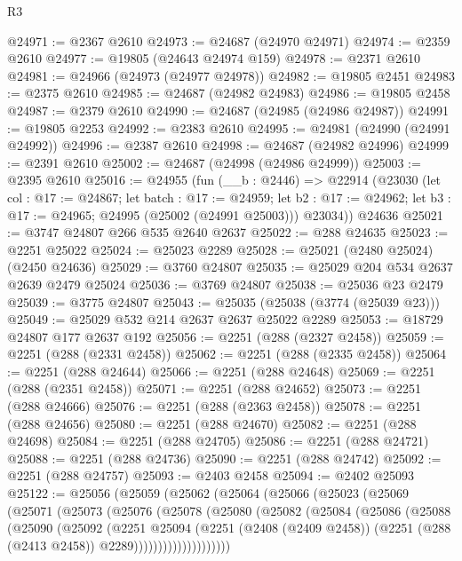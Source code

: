 \begin{lexlean}{R3}
\begin{coremodule}
@24971 := @2367 @2610
@24973 := @24687 (@24970 @24971)
@24974 := @2359 @2610
@24977 := @19805 (@24643 @24974 @159)
@24978 := @2371 @2610
@24981 := @24966 (@24973 (@24977 @24978))
@24982 := @19805 @2451
@24983 := @2375 @2610
@24985 := @24687 (@24982 @24983)
@24986 := @19805 @2458
@24987 := @2379 @2610
@24990 := @24687 (@24985 (@24986 @24987))
@24991 := @19805 @2253
@24992 := @2383 @2610
@24995 := @24981 (@24990 (@24991 @24992))
@24996 := @2387 @2610
@24998 := @24687 (@24982 @24996)
@24999 := @2391 @2610
@25002 := @24687 (@24998 (@24986 @24999))
@25003 := @2395 @2610
@25016 := @24955
    (fun (__b : @2446) =>
    @22914
      (@23030
        (let col : @17 := @24867;
        let batch : @17 := @24959;
        let b2 : @17 := @24962; let b3 : @17 := @24965; @24995 (@25002 (@24991 @25003)))
        @23034))
    @24636
@25021 := @3747 @24807 @266 @535 @2640 @2637
@25022 := @288 @24635
@25023 := @2251 @25022
@25024 := @25023 @2289
@25028 := @25021 (@2480 @25024) (@2450 @24636)
@25029 := @3760 @24807
@25035 := @25029 @204 @534 @2637 @2639 @2479 @25024
@25036 := @3769 @24807
@25038 := @25036 @23 @2479
@25039 := @3775 @24807
@25043 := @25035 (@25038 (@3774 (@25039 @23)))
@25049 := @25029 @532 @214 @2637 @2637 @25022 @2289
@25053 := @18729 @24807 @177 @2637 @192
@25056 := @2251 (@288 (@2327 @2458))
@25059 := @2251 (@288 (@2331 @2458))
@25062 := @2251 (@288 (@2335 @2458))
@25064 := @2251 (@288 @24644)
@25066 := @2251 (@288 @24648)
@25069 := @2251 (@288 (@2351 @2458))
@25071 := @2251 (@288 @24652)
@25073 := @2251 (@288 @24666)
@25076 := @2251 (@288 (@2363 @2458))
@25078 := @2251 (@288 @24656)
@25080 := @2251 (@288 @24670)
@25082 := @2251 (@288 @24698)
@25084 := @2251 (@288 @24705)
@25086 := @2251 (@288 @24721)
@25088 := @2251 (@288 @24736)
@25090 := @2251 (@288 @24742)
@25092 := @2251 (@288 @24757)
@25093 := @2403 @2458
@25094 := @2402 @25093
@25122 := @25056
    (@25059
      (@25062
        (@25064
          (@25066
            (@25023
              (@25069
                (@25071
                  (@25073
                    (@25076
                      (@25078
                        (@25080
                          (@25082
                            (@25084
                              (@25086
                                (@25088
                                  (@25090
                                    (@25092
                                      (@2251
                                        @25094
                                        (@2251
                                          (@2408 (@2409 @2458))
                                          (@2251 (@288 (@2413 @2458)) @2289))))))))))))))))))))

\end{coremodule}
\end{lexlean}
